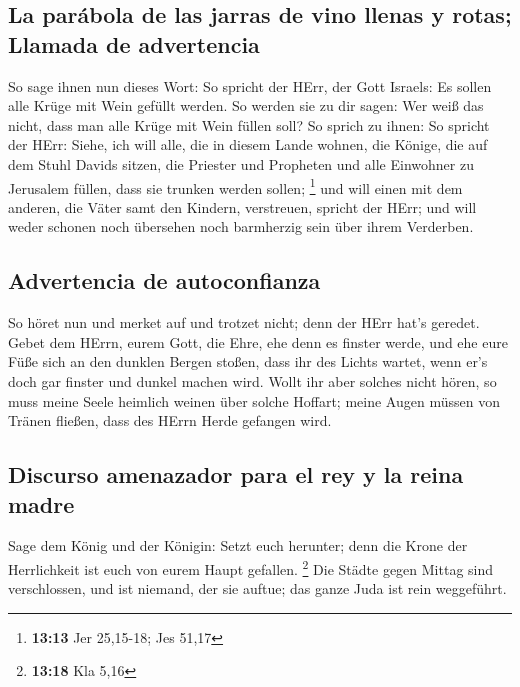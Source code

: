 \hypertarget{la-paruxe1bola-de-las-jarras-de-vino-llenas-y-rotas-llamada-de-advertencia}{%
\subsection{La parábola de las jarras de vino llenas y rotas; Llamada de
advertencia}\label{la-paruxe1bola-de-las-jarras-de-vino-llenas-y-rotas-llamada-de-advertencia}}

 So sage ihnen nun dieses Wort: So spricht der HErr, der
Gott Israels: Es sollen alle Krüge mit Wein gefüllt werden. So werden
sie zu dir sagen: Wer weiß das nicht, dass man alle Krüge mit Wein
füllen soll?  So sprich zu ihnen: So spricht der HErr:
Siehe, ich will alle, die in diesem Lande wohnen, die Könige, die auf
dem Stuhl Davids sitzen, die Priester und Propheten und alle Einwohner
zu Jerusalem füllen, dass sie trunken werden sollen; \footnote{\textbf{13:13}
  Jer 25,15-18; Jes 51,17}  und will einen mit dem
anderen, die Väter samt den Kindern, verstreuen, spricht der HErr; und
will weder schonen noch übersehen noch barmherzig sein über ihrem
Verderben.

\hypertarget{advertencia-de-autoconfianza}{%
\subsection{Advertencia de
autoconfianza}\label{advertencia-de-autoconfianza}}

 So höret nun und merket auf und trotzet nicht; denn der
HErr hat's geredet.  Gebet dem HErrn, eurem Gott, die
Ehre, ehe denn es finster werde, und ehe eure Füße sich an den dunklen
Bergen stoßen, dass ihr des Lichts wartet, wenn er's doch gar finster
und dunkel machen wird.  Wollt ihr aber solches nicht
hören, so muss meine Seele heimlich weinen über solche Hoffart; meine
Augen müssen von Tränen fließen, dass des HErrn Herde gefangen wird.

\hypertarget{discurso-amenazador-para-el-rey-y-la-reina-madre}{%
\subsection{Discurso amenazador para el rey y la reina
madre}\label{discurso-amenazador-para-el-rey-y-la-reina-madre}}

 Sage dem König und der Königin: Setzt euch herunter;
denn die Krone der Herrlichkeit ist euch von eurem Haupt gefallen.
\footnote{\textbf{13:18} Kla 5,16}  Die Städte gegen
Mittag sind verschlossen, und ist niemand, der sie auftue; das ganze
Juda ist rein weggeführt.

